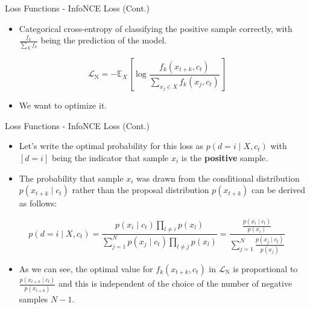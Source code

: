 \documentclass[serif, aspectratio=169]{beamer}
\begin{document}
\begin{frame}{Loss Functions - InfoNCE Loss (Cont.)}
     \begin{itemize}
         \item Categorical cross-entropy of classifying the positive sample correctly, with $\frac{f_k}{\sum_X f_k}$ being the prediction of the model.
     \end{itemize}

     \begin{equation*}
         \mathcal{L}_{\mathrm{N}}=-{\mathbb{E}_X}\left[\log \frac{f_k\left(x_{t+k}, c_t\right)}{\sum_{x_j \in X} f_k\left(x_j, c_t\right)}\right]
     \end{equation*}

     \begin{itemize}
         \item We want to optimize it.
     \end{itemize}
\end{frame}


\begin{frame}{Loss Functions - InfoNCE Loss (Cont.)}
     \begin{itemize}
         \item Let's write the optimal probability for this loss as $p\left(d=i \mid X, c_t\right)$ with $[d=i]$ being the indicator that sample $x_i$ is the \textbf{positive} sample.
         \item The probability that sample $x_i$ was drawn from the conditional distribution $p\left(x_{t+k} \mid c_t\right)$ rather than the proposal distribution $p\left(x_{t+k}\right)$ can be derived as follows:
     \end{itemize}

     \begin{equation*}
         p\left(d=i \mid X, c_t\right)=
         \frac{p\left(x_i \mid c_t\right) \prod_{l \neq i} p\left(x_l\right)}{\sum_{j=1}^N p\left(x_j \mid c_t\right) \prod_{l \neq j} p\left(x_l\right)}=
         \frac{\frac{p\left(x_i \mid c_t\right)}{p\left(x_i\right)}}{\sum_{j=1}^N \frac{p\left(x_j \mid c_t\right)}{p\left(x_j\right)}}
     \end{equation*}

     \begin{itemize}
         \item As we can see, the optimal value for $f_k\left(x_{t+k}, c_t\right)$ in $\mathcal{L}_{\mathrm{N}}$ is proportional to $\frac{p\left(x_{t+k} \mid c_t\right)}{p\left(x_{t+k}\right)}$ and this is independent of the choice of the number of negative samples $N - 1$.
     \end{itemize}
\end{frame}
\end{document}
